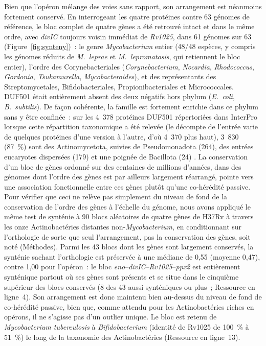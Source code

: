 \documentclass[11pt,a4paper]{article}
\newcommand{\mtb}{\textit{Mycobacterium tuberculosis}}
\begin{document}
Bien que l'opéron mélange des voies sans rapport, son arrangement est néanmoins fortement conservé. En interrogeant les quatre protéines contre 63 génomes de référence, le bloc complet de quatre gènes a été retrouvé intact et dans le même ordre, avec \textit{divIC} toujours voisin immédiat de \textit{Rv1025}, dans 61 génomes sur 63 (Figure~\ref{fig:synteny})~: le genre \textit{Mycobacterium} entier (48/48 espèces, y compris les génomes réduits de \textit{M.\ leprae} et \textit{M.\ lepromatosis}, qui retiennent le bloc entier), l'ordre des Corynebacteriales (\textit{Corynebacterium}, \textit{Nocardia}, \textit{Rhodococcus}, \textit{Gordonia}, \textit{Tsukamurella}, \textit{Mycobacteroides}), et des représentants des Streptomycetales, Bifidobacteriales, Propionibacteriales et Micrococcales. DUF501 était entièrement absent des deux négatifs hors phylum (\textit{E.\ coli}, \textit{B.\ subtilis}). De façon cohérente, la famille est fortement enrichie dans ce phylum sans y être confinée~: sur les 4~378 protéines DUF501 répertoriées dans InterPro lorsque cette répartition taxonomique a été relevée (le décompte de l'entrée varie de quelques protéines d'une version à l'autre, d'où 4~370 plus haut), 3~830 (87~\%) sont des Actinomycetota, suivies de Pseudomonadota (264), des entrées eucaryotes dispersées (179) et une poignée de Bacillota (24) \citep{paysanlafosse2023interpro}. La conservation d'un bloc de gènes ordonné sur des centaines de millions d'années, dans des génomes dont l'ordre des gènes est par ailleurs largement réarrangé, pointe vers une association fonctionnelle entre ces gènes plutôt qu'une co-hérédité passive. Pour vérifier que ceci ne relève pas simplement du niveau de fond de la conservation de l'ordre des gènes à l'échelle du génome, nous avons appliqué le même test de synténie à 90 blocs aléatoires de quatre gènes de H37Rv à travers les onze Actinobactéries distantes non-\textit{Mycobacterium}, en conditionnant sur l'orthologie de sorte que seul l'arrangement, pas la conservation des gènes, soit noté (Méthodes). Parmi les 43 blocs dont les gènes sont largement conservés, la synténie sachant l'orthologie est préservée à une médiane de 0,55 (moyenne 0,47), contre 1,00 pour l'opéron~: le bloc \textit{eno}--\textit{divIC}--\textit{Rv1025}--\textit{ppx2} est entièrement synténique partout où ses gènes sont présents et se situe dans le cinquième supérieur des blocs conservés (8 des 43 aussi synténiques ou plus~; Ressource en ligne~4). Son arrangement est donc maintenu bien au-dessus du niveau de fond de co-hérédité passive, bien que, comme attendu pour les Actinobactéries riches en opérons, il ne s'agisse pas d'un outlier unique. Le bloc est retenu de \mtb{} à \textit{Bifidobacterium} (identité de Rv1025 de 100~\% à 51~\%) le long de la taxonomie des Actinobactéries (Ressource en ligne~13).
\end{document}

